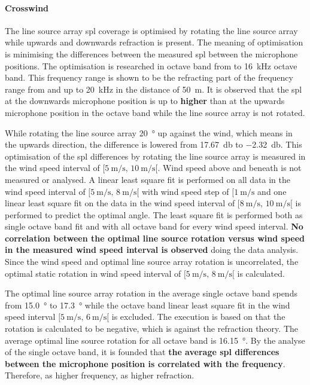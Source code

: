 \paragraph{Crosswind}
The line source array \gls{spl} coverage is optimised by rotating the line source array while upwards and downwards refraction is present. The meaning of optimisation is minimising the differences between the measured \gls{spl} between the microphone positions. The optimisation is researched in octave band from  to \SI{16}{\kilo\hertz} octave band. This frequency range is shown to be the refracting part of the frequency range from  and up to \SI{20}{\kilo\hertz} in the distance of \SI{50}{\meter}. It is observed that the \gls{spl} at the downwards microphone position is up to\textbf{  higher} than at the upwards microphone position in the  octave band while the line source array is not rotated. 

While rotating the line source array \SI{20}{\degree} up against the wind, which means in the upwards direction, the difference is lowered from \SI{17.67}{\decibel}  to \SI{-2.32}{\decibel}. This optimisation of the \gls{spl} differences by rotating the line source array is measured in the wind speed interval of $[\SI{5}{\meter\per\second},\, \SI{10}{\meter\per\second}[ $. Wind speed above and beneath is not measured or analysed. A linear least square fit is performed on all data in the wind speed interval of $[\SI{5}{\meter\per\second},\, \SI{8}{\meter\per\second}[ $ with wind speed step of $[\SI{1}{\meter\per\second}$ and one linear least square fit on the data in the wind speed interval of $[\SI{8}{\meter\per\second},\, \SI{10}{\meter\per\second}[ $ is performed to predict the optimal angle. The least square fit is performed both as single octave band fit and with all octave band for every wind speed interval. \textbf{No correlation between the optimal line source rotation versus wind speed in the measured wind speed interval is observed} doing the data analysis. Since the wind speed and optimal line source array rotation is uncorrelated, the optimal static rotation in wind speed interval of $[\SI{5}{\meter\per\second},\, \SI{8}{\meter\per\second}[ $ is calculated.

The optimal line source array rotation in the average single octave band spends from \SI{15.0}{\degree} to \SI{17.3}{\degree} while the  octave band linear least square fit in the wind speed interval  $[\SI{5}{\meter\per\second},\, \SI{6}{\meter\per\second}[ $  is excluded. The execution is based on that the rotation is calculated to be negative, which is against the refraction theory. The average optimal line source rotation for all octave band is \SI{16.15}{\degree}. By the analyse of the single octave band, it is founded that \textbf{the average \gls{spl} differences between the microphone position is correlated with the frequency}. Therefore, as higher frequency, as higher refraction.


